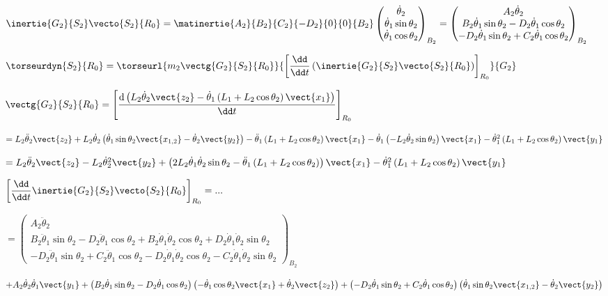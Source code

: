 \begin{corrige}
$\inertie{G_2}{S_2}\vecto{S_2}{R_0}=
\matinertie{A_2}{B_2}{C_2}{-D_2}{0}{0}{B_2}
\begin{pmatrix}
\dot{\theta}_2 \\
\dot{\theta}_1\sin\theta_2\\
\dot{\theta}_1\cos\theta_2
\end{pmatrix}_{B_2}
=
\begin{pmatrix}
A_2\dot{\theta}_2 \\
B_2\dot{\theta}_1\sin\theta_2 - D_2 \dot{\theta}_1\cos\theta_2\\
-D_2\dot{\theta}_1\sin\theta_2 +C_2 \dot{\theta}_1\cos\theta_2
\end{pmatrix}_{B_2}
$

$\torseurdyn{S_2}{R_0}
=\torseurl{
m_2 \vectg{G_2}{S_2}{R_0}
}{
\left[\dfrac{\dd}{\dd t}\left(\inertie{G_2}{S_2}\vecto{S_2}{R_0}\right)\right]_{R_0}
}{G_2}
$

$\vectg{G_2}{S_2}{R_0}
=\left[\dfrac{\text{d}\left( L_2 \dot{\theta}_2 \vect{z_2}-
\dot{\theta}_1\left (L_1+L_2 \cos\theta_2 \right)\vect{x_1}\right)}{\dd t}\right]_{R_0}$

$=L_2 \ddot{\theta}_2 \vect{z_2}+L_2 \dot{\theta}_2 \left( \dot{\theta}_1 \sin\theta_2 \vect{x_{1,2}} -\dot{\theta}_2 \vect{y_2} \right)
-\ddot{\theta}_1\left (L_1+L_2 \cos\theta_2 \right)\vect{x_1}
-\dot{\theta}_1\left (-L_2 \dot{\theta}_2\sin\theta_2 \right)\vect{x_1}
-\dot{\theta}_1^2\left (L_1+L_2 \cos\theta_2 \right)\vect{y_1}$

$=L_2 \ddot{\theta}_2 \vect{z_2}-L_2 \dot{\theta}_2^2 \vect{y_2} 
+\left(2L_2 \dot{\theta}_1 \dot{\theta}_2 \sin\theta_2 %
-\ddot{\theta}_1\left (L_1+L_2 \cos\theta_2 \right)\right)\vect{x_1}
-\dot{\theta}_1^2\left (L_1+L_2 \cos\theta_2 \right)\vect{y_1}$


$\left[\dfrac{\dd}{\dd t}\inertie{G_2}{S_2}\vecto{S_2}{R_0}\right]_{R_0}=...$

$=
\begin{pmatrix}
A_2\ddot{\theta}_2 \\
B_2\ddot{\theta}_1\sin\theta_2 - D_2 \ddot{\theta}_1\cos\theta_2
+B_2\dot{\theta}_1\dot{\theta}_2\cos\theta_2 + D_2 \dot{\theta}_1\dot{\theta}_2\sin\theta_2\\
-D_2\ddot{\theta}_1\sin\theta_2 +C_2 \ddot{\theta}_1\cos\theta_2-D_2\dot{\theta}_1\dot{\theta}_2\cos\theta_2 -C_2 \dot{\theta}_1\dot{\theta}_2\sin\theta_2
\end{pmatrix}_{B_2}
$

$
+
A_2\dot{\theta}_2 \dot{\theta}_1 \vect{y_1}
+\left(B_2\dot{\theta}_1\sin\theta_2 - D_2 \dot{\theta}_1\cos\theta_2\right)\left( -\dot{\theta}_1 \cos\theta_2\vect{x_1}+\dot{\theta}_2 \vect{z_2}\right)
+\left(-D_2\dot{\theta}_1\sin\theta_2 +C_2 \dot{\theta}_1\cos\theta_2\right) \left( \dot{\theta}_1 \sin\theta_2 \vect{x_{1,2}} -\dot{\theta}_2 \vect{y_2} \right)
$




\end{corrige}

